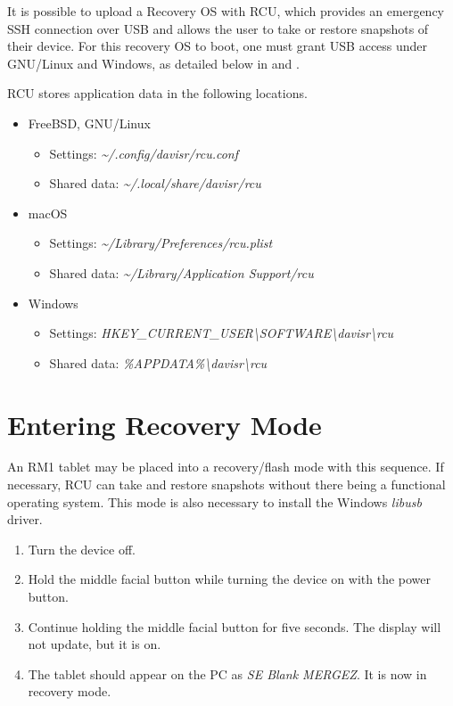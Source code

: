 It is possible to upload a Recovery OS with RCU, which provides an emergency SSH connection over USB and allows the user to take or restore snapshots of their device. For this recovery OS to boot, one must grant USB access under GNU/Linux and Windows, as detailed below in  and .

RCU stores application data in the following locations.

\begin{itemize}
\item{FreeBSD, GNU/Linux}
  \begin{itemize}
  \item[]{Settings: \textit{\textasciitilde/.config/davisr/rcu.conf}}
  \item[]{Shared data: \textit{\textasciitilde/.local/share/davisr/rcu}}
  \end{itemize}
\item{macOS}
  \begin{itemize}
    \item[]{Settings: \textit{\textasciitilde/Library/Preferences/rcu.plist}}
    \item[]{Shared data: \textit{\textasciitilde/Library/Application Support/rcu}}
  \end{itemize}
\item{Windows}
  \begin{itemize}
  \item[]{Settings: \textit{HKEY\_CURRENT\_USER\textbackslash SOFTWARE\textbackslash davisr\textbackslash rcu}}
  \item[]{Shared data: \textit{\%APPDATA\%\textbackslash davisr\textbackslash rcu}}
  \end{itemize}
\end{itemize}

\newpage
\section{Entering Recovery Mode}
\label{sec:enteringrecoverymode}
An RM1 tablet may be placed into a recovery/flash mode with this sequence. If necessary, RCU can take and restore snapshots without there being a functional operating system. This mode is also necessary to install the Windows \textit{libusb} driver.

\begin{enumerate}
\item{Turn the device off.}
\item{Hold the middle facial button while turning the device on with the power button.}
\item{Continue holding the middle facial button for five seconds. The display will not update, but it is on.}
\item{The tablet should appear on the PC as \textit{SE Blank MERGEZ}. It is now in recovery mode.}
\end{enumerate}

